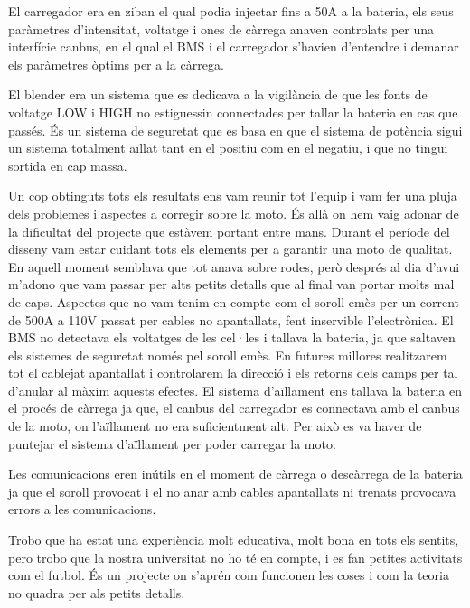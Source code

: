 El carregador era en ziban el qual podia injectar fins a 50A a la bateria, els seus paràmetres d'intensitat, voltatge i ones de càrrega anaven controlats per una interfície canbus, en el qual el BMS i el carregador s'havien d'entendre i demanar els paràmetres òptims per a la càrrega.

El blender era un sistema que es dedicava a la vigilància de que les fonts de voltatge LOW i HIGH no estiguessin connectades per tallar la bateria en cas que passés. És un sistema de seguretat que es basa en que el sistema de potència sigui un sistema totalment aïllat tant en el positiu com en el negatiu, i que no tingui sortida en cap massa.

Un cop obtinguts tots els resultats ens vam reunir tot l'equip i vam fer una pluja dels problemes i aspectes a corregir sobre la moto. És allà on hem vaig adonar de la dificultat del projecte que estàvem portant entre mans. Durant el període del disseny vam estar cuidant tots els elements per a garantir una moto de qualitat. En aquell moment semblava que tot anava sobre rodes, però després al dia d'avui m'adono que vam passar per alts petits detalls que al final van portar molts mal de caps. Aspectes que no vam tenim en compte com el soroll emès per un corrent de 500A a 110V passat per cables no apantallats, fent inservible l'electrònica. El BMS no detectava els voltatges de les cel·les i tallava la bateria, ja que saltaven els sistemes de seguretat només pel soroll emès. En futures millores realitzarem tot el cablejat apantallat i controlarem la direcció i els retorns dels camps per tal d'anular al màxim aquests efectes. El sistema d'aïllament ens tallava la bateria en el procés de càrrega ja que, el canbus del carregador es connectava amb el canbus de la moto, on l'aïllament no era suficientment alt. Per això es va haver de puntejar el sistema d'aïllament per poder carregar la moto.

Les comunicacions eren inútils en el moment de càrrega o descàrrega de la bateria ja que el soroll provocat i el no anar amb cables apantallats ni trenats provocava errors a les comunicacions.

Trobo que ha estat una experiència molt educativa, molt bona en tots els sentits, pero trobo que la nostra universitat no ho té en compte, i es fan petites activitats com el futbol. És un projecte on s'aprén com funcionen les coses i com la teoria no quadra per als petits detalls.

